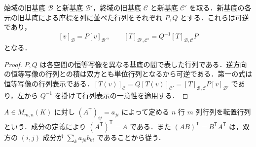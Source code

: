 \begin{prop}[基底変換と表示行列]
始域の旧基底 $\mathcal B$ と新基底 $\mathcal B'$，終域の旧基底 $\mathcal C$ と新基底 $\mathcal C'$ を取る．新基底の各元の旧基底による座標を列に並べた行列をそれぞれ $P,Q$ とする．これらは可逆であり，
\[
 [v]_{\mathcal B}=P[v]_{\mathcal B'},\qquad
 [T]_{\mathcal B',\mathcal C'}=Q^{-1}[T]_{\mathcal B,\mathcal C}P
\]
となる．
\end{prop}
\begin{proof}
$P,Q$ は各空間の恒等写像を異なる基底の間で表した行列である．逆方向の恒等写像の行列との積は双方とも単位行列となるから可逆である．第一の式は恒等写像の行列表示である．$[T(v)]_{\mathcal C}=Q[T(v)]_{\mathcal C'}=[T]_{\mathcal B,\mathcal C}P[v]_{\mathcal B'}$ であり，左から $Q^{-1}$ を掛けて行列表示の一意性を適用する．
\end{proof}
\begin{defn}[転置行列]
$A\in M_{m,n}(K)$ に対し $(A^{\mathsf T})_{ij}=a_{ji}$ によって定める $n$ 行 $m$ 列行列を転置行列という．成分の定義により $(A^{\mathsf T})^{\mathsf T}=A$ である．また $(AB)^{\mathsf T}=B^{\mathsf T}A^{\mathsf T}$ は，双方の $(i,j)$ 成分が $\sum_k a_{jk}b_{ki}$ であることから従う．
\end{defn}
